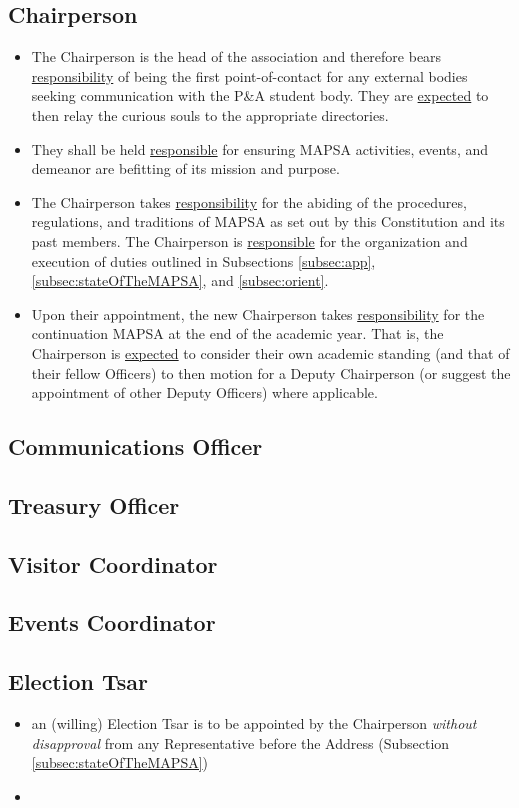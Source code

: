 \documentclass[8pt]{article}
\begin{document}
	\subsection{Chairperson}
	\begin{itemize}
		\item The Chairperson is the head of the association and therefore bears \underline{responsibility} of being the first point-of-contact for any external bodies seeking communication with the P\&A student body. They are \underline{expected} to then relay the curious souls to the appropriate directories. 
		\item They shall be held \underline{responsible} for ensuring MAPSA activities, events, and demeanor are befitting of its mission and purpose. 
		\item The Chairperson takes \underline{responsibility} for the abiding of the procedures, regulations, and traditions of MAPSA as set out by this Constitution and its past members.
		The Chairperson is \underline{responsible} for the organization and execution of duties outlined in Subsections \ref{subsec:app}, \ref{subsec:stateOfTheMAPSA}, and \ref{subsec:orient}.
		\item Upon their appointment, the new Chairperson takes \underline{responsibility} for the continuation MAPSA at the end of the academic year. That is, the Chairperson is \underline{expected} to consider their own academic standing (and that of their fellow Officers) to then motion for a Deputy Chairperson (or suggest the appointment of other Deputy Officers) where applicable.
	\end{itemize}
	\subsection{Communications Officer}
	\subsection{Treasury Officer}
	\subsection{Visitor Coordinator}
	\subsection{Events Coordinator}
	\subsection{Election Tsar}
	\begin{itemize}
		\item an (willing) Election Tsar is to be appointed by the Chairperson \textit{without disapproval} from any Representative before the Address (Subsection \ref{subsec:stateOfTheMAPSA})
		\item 
	\end{itemize}
\end{document}
